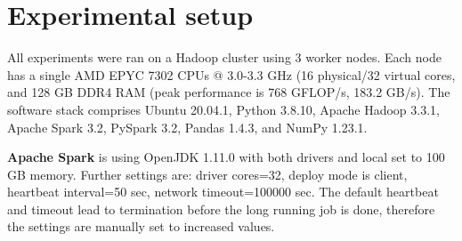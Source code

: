\section{Experimental setup}
\label{sec:experimental_setup}

All experiments were ran on a Hadoop cluster using 3 worker nodes. 
Each node has a single AMD EPYC 7302 CPUs @ 3.0-3.3 GHz (16 physical/32 virtual cores, and 128 GB DDR4 RAM (peak performance is 768 GFLOP/s, 183.2 GB/s).
The software stack comprises Ubuntu 20.04.1, Python 3.8.10, Apache Hadoop 3.3.1, Apache Spark 3.2, PySpark 3.2, Pandas 1.4.3, and NumPy 1.23.1.

\textbf{Apache Spark} is using OpenJDK 1.11.0 with both drivers and local set to 100 GB memory.
Further settings are: driver cores=32, deploy mode is client, heartbeat interval=50 sec, network timeout=100000 sec.
The default heartbeat and timeout lead to termination before the long running job is done, therefore the settings are manually set to increased values.

